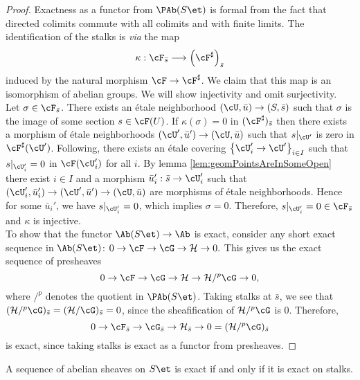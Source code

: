 \begin{proof}
Exactness as a functor from $\PAb(S\et)$ is formal from the fact that directed colimits commute with all colimits and with finite limits. The identification of the stalks is {\it via} the map
$$
\kappa : \cF_{\bar s}\longrightarrow \left(\cF^\sharp\right)_{\bar s}
$$
induced by the natural morphism $\cF\to \cF^\sharp$.  We claim that this map is an isomorphism of abelian groups.  We will show injectivity and omit surjectivity. 
\\
Let $\sigma\in \cF_{\bar s}$. There exists an \'etale neighborhood $(\cU, \bar u)\to (S, \bar s)$ such that $\sigma$ is the image of some section $s \in \cF(U)$. If $\kappa(\sigma) = 0$ in $(\cF^\sharp)_{\bar s}$ then there exists a morphism of \'etale neighborhoods $(\cU', \bar u')\to (\cU, \bar u)$ such that $s|_{\cU'}$ is zero in $\cF^\sharp(\cU')$. Following, there exists an \'etale covering $\left\{\cU_i'\to \cU'\right\}_{i\in I}$ such that $s|_{\cU_i'}=0$ in $\cF(\cU_i')$ for all $i$. By lemma \ref{lem:geomPointsAreInSomeOpen} there exist  $i \in I$ and a morphism $\bar u_i': \bar s \to \cU_i'$ such that  $(\cU_i', \bar u_i')\to (\cU', \bar u')\to (\cU, \bar u)$ are morphisms of \'etale neighborhoods. Hence for some $\bar u_i'$, we have $s|_{\cU'_i}=0$, which implies $\sigma = 0$.  Therefore, $s|_{\cU'_i} = 0 \in \cF_{\bar s}$ and $\kappa$ is injective.
\\
To show that the functor $\Ab(S\et) \to \Ab$ is exact, consider any short exact sequence in $\Ab(S\et)$:
$
0\to \cF\to \cG\to \mathcal H \to 0.
$
This gives us the  exact sequence of presheaves
$$
0 \to \cF\to \cG \to \mathcal H\to \mathcal H/^p\cG \to 0,
$$
where $/^p$ denotes the quotient in $\PAb(S\et)$. Taking stalks at $\bar s$, we see that $(\mathcal H /^p\cG)_{\bar{s}} = (\mathcal H /\cG)_{\bar{s}} = 0$, since the sheafification of $\mathcal H/^p\cG$ is $0$. 
Therefore, 
$$
0\to \cF_{\bar s	} \to \cG_{\bar s} \to \mathcal{H}_{\bar s} \to 0 = (\mathcal H/^p\cG)_{\bar s}
$$
is exact, since taking stalks is exact as a functor from presheaves.
\end{proof}

\begin{thm}
A sequence of abelian sheaves on $S\et$ is exact if and only if it is exact on stalks.  
\end{thm}

